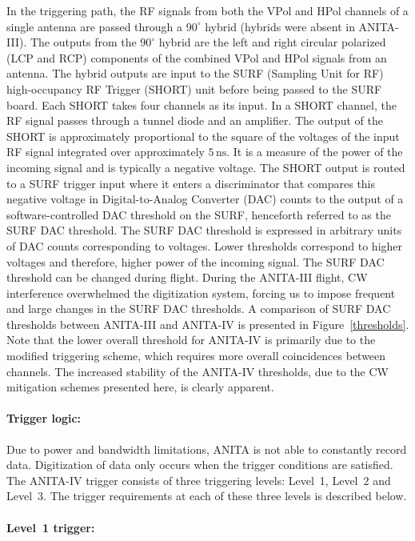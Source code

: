 \documentclass[preprint,12pt]{elsarticle}
\begin{document}
In the triggering path, the RF signals from both the VPol and HPol channels of a single antenna 
are passed through a $90^{\circ}$ hybrid (hybrids were absent in ANITA-III). 
The outputs from the $90^{\circ}$ hybrid are the left and right circular polarized
(LCP and RCP) components of the combined VPol and HPol signals from an antenna. 
The hybrid outputs are input to the SURF (Sampling Unit for RF) high-occupancy RF Trigger (SHORT) unit before being passed to the SURF board. 
Each SHORT takes four channels as its input. 
In a SHORT
channel, the RF signal passes through a tunnel diode and an amplifier. 
The output of the SHORT is
approximately proportional to the square of the voltages
of the input RF signal integrated over approximately $5\,\mbox{ns}$.
It is a measure of the power of the incoming signal and is typically a negative voltage.
The SHORT output is routed to a SURF trigger input where 
it enters a discriminator that compares this negative voltage in Digital-to-Analog Converter (DAC) counts to the output
of a software-controlled DAC threshold on the SURF, henceforth referred to as the SURF DAC threshold. 
The SURF DAC threshold is expressed in arbitrary units of DAC counts corresponding to voltages. Lower thresholds 
correspond to higher voltages and therefore, higher power of the incoming signal. 
The SURF DAC threshold can be changed during flight. 
During the ANITA-III flight, CW interference overwhelmed the digitization system, forcing us to impose
frequent and large changes in the SURF DAC thresholds. 
A comparison of SURF DAC thresholds between ANITA-III and ANITA-IV is presented in Figure~\ref{thresholds}.
Note that the lower overall threshold for ANITA-IV is primarily due to the modified triggering scheme, 
which requires more overall coincidences between channels. 
The increased stability of the ANITA-IV thresholds, due to the CW mitigation schemes presented here, is clearly apparent.

\paragraph{Trigger logic:}
Due to power and bandwidth limitations, ANITA is not able to constantly record data. 
Digitization of data only occurs when the trigger conditions are satisfied.
The ANITA-IV trigger consists of three triggering levels: Level~1, Level~2 and Level~3. 
The trigger requirements at each of these three levels is described below.

\paragraph{Level~1 trigger:}
\end{document}
